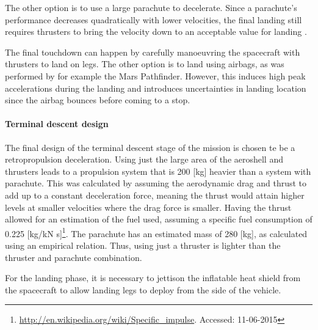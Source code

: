 The other option is to use a large parachute to decelerate. Since a parachute's performance decreases quadratically with lower velocities, the final landing still requires thrusters to bring the velocity down to an acceptable value for landing \cite{Braun2007}.

The final touchdown can happen by carefully manoeuvring the spacecraft with thrusters to land on legs. The other option is to land using airbags, as was performed by for example the Mars Pathfinder. However, this induces high peak accelerations during the landing and introduces uncertainties in landing location since the airbag bounces before coming to a stop.

\paragraph{Terminal descent design}
The final design of the terminal descent stage of the mission is chosen te be a retropropulsion deceleration. Using just the large area of the aeroshell and thrusters leads to a propulsion system that is 200 [kg] heavier than a system with parachute. This was calculated by assuming the aerodynamic drag and thrust to add up to a constant deceleration force, meaning the thrust would attain higher levels at smaller velocities where the drag force is smaller. Having the thrust allowed for an estimation of the fuel used, assuming a specific fuel consumption of 0.225 [kg/kN s]\footnote{\url{http://en.wikipedia.org/wiki/Specific_impulse}. Accessed: 11-06-2015}. The parachute has an estimated mass of 280 [kg], as calculated using an empirical relation. Thus, using just a thruster is lighter than the thruster and parachute combination.

For the landing phase, it is necessary to jettison the inflatable heat shield from the spacecraft to allow landing legs to deploy from the side of the vehicle.
